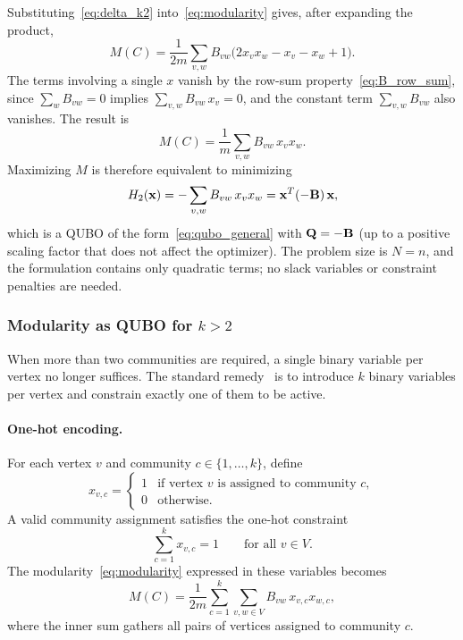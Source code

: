 Substituting~\eqref{eq:delta_k2} into~\eqref{eq:modularity} gives,
after expanding the product,
\begin{equation*}
    M(C) = \frac{1}{2m} \sum_{v,w} B_{vw} \bigl( 2 x_v x_w - x_v - x_w
    + 1 \bigr).
\end{equation*}
The terms involving a single $x$ vanish by the row-sum
property~\eqref{eq:B_row_sum}, since $\sum_w B_{vw} = 0$ implies
$\sum_{v,w} B_{vw} \, x_v = 0$, and the constant term $\sum_{v,w}
B_{vw}$ also vanishes. The result is
\begin{equation}
    M(C) = \frac{1}{m} \sum_{v,w} B_{vw} \, x_v x_w.
    \label{eq:modularity_k2_quadratic}
\end{equation}
Maximizing $M$ is therefore equivalent to minimizing
\begin{equation}
    H_2(\mathbf{x}) = -\sum_{v,w} B_{vw} \, x_v x_w = \mathbf{x}^T (-\mathbf{B}) \, \mathbf{x},
    \label{eq:qubo_k2}
\end{equation}
which is a QUBO of the form~\eqref{eq:qubo_general} with
$\mathbf{Q} = -\mathbf{B}$ (up to a positive scaling factor that does not affect
the optimizer). The problem size is $N = n$, and the formulation
contains only quadratic terms; no slack variables or constraint
penalties are needed.


\subsubsection{Modularity as QUBO for $k > 2$}
\label{sec:method_qubo_multi}

When more than two communities are required, a single binary
variable per vertex no longer suffices. The standard
remedy~\cite{negre2020detecting, wang2024quantum} is to introduce
$k$ binary variables per vertex and constrain exactly one of them
to be active.

\paragraph{One-hot encoding.}
For each vertex $v$ and community $c \in \{1, \ldots, k\}$, define
\begin{equation*}
    x_{v,c} = \begin{cases} 1 & \text{if vertex } v \text{ is
    assigned to community } c, \\ 0 & \text{otherwise.} \end{cases}
\end{equation*}
A valid community assignment satisfies the one-hot constraint
\begin{equation}
    \sum_{c=1}^{k} x_{v,c} = 1 \qquad \text{for all } v \in V.
    \label{eq:one_hot}
\end{equation}
The modularity~\eqref{eq:modularity} expressed in these variables
becomes
\begin{equation}
    M(C) = \frac{1}{2m} \sum_{c=1}^{k} \sum_{v,w \in V} B_{vw} \,
    x_{v,c} x_{w,c},
    \label{eq:modularity_onehot}
\end{equation}
where the inner sum gathers all pairs of vertices assigned to
community $c$.

